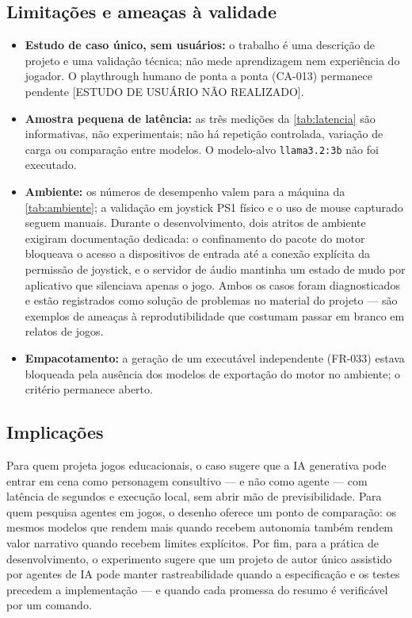 \subsection{Limitações e ameaças à validade}

\begin{itemize}
  \item \textbf{Estudo de caso único, sem usuários:} o trabalho é uma
  descrição de projeto e uma validação técnica; não mede aprendizagem nem
  experiência do jogador. O playthrough humano de ponta a ponta (CA-013)
  permanece pendente [ESTUDO DE USUÁRIO NÃO REALIZADO].
  \item \textbf{Amostra pequena de latência:} as três medições da
  \autoref{tab:latencia} são informativas, não experimentais; não há repetição
  controlada, variação de carga ou comparação entre modelos. O modelo-alvo
  \texttt{llama3.2:3b} não foi executado.
  \item \textbf{Ambiente:} os números de desempenho valem para a máquina da
  \autoref{tab:ambiente}; a validação em joystick PS1 físico e o uso de mouse
  capturado seguem manuais. Durante o desenvolvimento, dois atritos de ambiente
  exigiram documentação dedicada: o confinamento do pacote do motor bloqueava o
  acesso a dispositivos de entrada até a conexão explícita da permissão de
  joystick, e o servidor de áudio mantinha um estado de mudo por aplicativo que
  silenciava apenas o jogo. Ambos os casos foram diagnosticados e estão
  registrados como solução de problemas no material do projeto
  \citep{lab404repo} --- são exemplos de ameaças à reprodutibilidade que
  costumam passar em branco em relatos de jogos.
  \item \textbf{Empacotamento:} a geração de um executável independente
  (FR-033) estava bloqueada pela ausência dos modelos de exportação do motor no
  ambiente; o critério permanece aberto.
\end{itemize}

\subsection{Implicações}

Para quem projeta jogos educacionais, o caso sugere que a IA generativa pode
entrar em cena como personagem consultivo --- e não como agente --- com
latência de segundos e execução local, sem abrir mão de previsibilidade. Para
quem pesquisa agentes em jogos, o desenho oferece um ponto de comparação: os
mesmos modelos que rendem mais quando recebem autonomia também rendem valor
narrativo quando recebem limites explícitos. Por fim, para a prática de
desenvolvimento, o experimento sugere que um projeto de autor único assistido
por agentes de IA pode manter rastreabilidade quando a especificação e os
testes precedem a implementação --- e quando cada promessa do resumo é
verificável por um comando.
